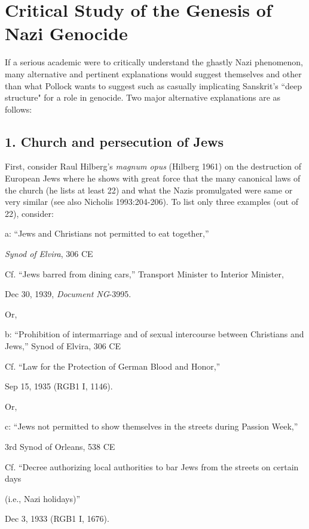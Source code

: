 \section*{Critical Study of the Genesis of Nazi Genocide}

If a serious academic were to critically understand the ghastly Nazi phenomenon, many alternative and pertinent explanations would suggest themselves and other than what Pollock wants to suggest such as casually implicating Sanskrit's ``deep structure" for a role in genocide. Two major alternative explanations are as follows:

\subsection*{1. Church and persecution of Jews}
First, consider Raul Hilberg's {\sl magnum opus} (Hilberg 1961) on the destruction of European Jews where he shows with great force that the many canonical laws of the church (he lists at least 22) and what the Nazis promulgated were same or very similar (see also Nicholis 1993:204-206). To list only three examples (out of 22), consider:

a: “Jews and Christians not permitted to eat together,”

{\sl Synod of Elvira}, 306 CE

Cf. “Jews barred from dining cars,” Transport Minister to Interior Minister, 

Dec 30, 1939, {\sl Document NG}-3995. 
\medskip

Or, 

b: “Prohibition of intermarriage and of sexual intercourse between Christians and Jews,” Synod of Elvira, 306 CE 

Cf. “Law for the Protection of German Blood and Honor,” 

Sep 15, 1935 (RGB1 I, 1146).
\medskip

Or,

c: “Jews not permitted to show themselves in the streets during Passion Week,” 

3rd  Synod of Orleans, 538 CE 

Cf. “Decree authorizing local authorities to bar Jews from the streets on certain days

(i.e., Nazi holidays)” 

Dec 3, 1933 (RGB1 I, 1676).

